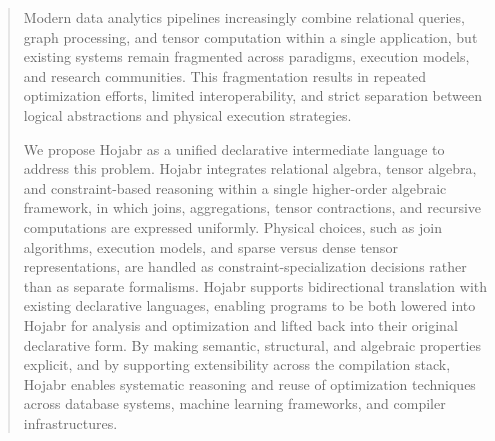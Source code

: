\documentclass[sigconf,nonacm]{acmart}
\begin{document}
\newenvironment{myboxed}
    {
    \begin{center}
    \begin{tabular}{|l|}
    \hline 
    }
    { 
    \\\hline
    \end{tabular} 
    \end{center}
    }
%

\newenvironment{hojabrcode}[0]
{ %
  \begin{lstlisting}
}
{ % End Code: Executed by \end{important}
  \end{lstlisting}
}


\begin{abstract}
Modern data analytics pipelines increasingly combine relational queries, graph processing, and tensor computation within a single application, but existing systems remain fragmented across paradigms, execution models, and research communities. This fragmentation results in repeated optimization efforts, limited interoperability, and strict separation between logical abstractions and physical execution strategies. 

We propose Hojabr as a unified declarative intermediate language to address this problem. Hojabr integrates relational algebra, tensor algebra, and constraint-based reasoning within a single higher-order algebraic framework, in which joins, aggregations, tensor contractions, and recursive computations are expressed uniformly. Physical choices, such as join algorithms, execution models, and sparse versus dense tensor representations, are handled as constraint-specialization decisions rather than as separate formalisms. Hojabr supports bidirectional translation with existing declarative languages, enabling programs to be both lowered into Hojabr for analysis and optimization and lifted back into their original declarative form. By making semantic, structural, and algebraic properties explicit, and by supporting extensibility across the compilation stack, Hojabr enables systematic reasoning and reuse of optimization techniques across database systems, machine learning frameworks, and compiler infrastructures.
\end{abstract}
\end{document}
